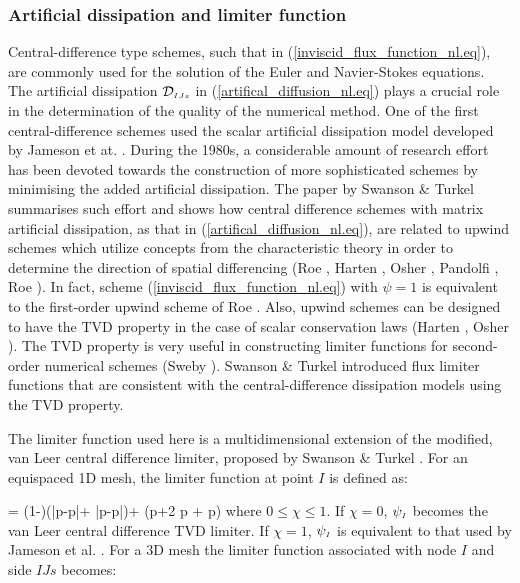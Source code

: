 \subsubsection{Artificial dissipation and limiter function}
%
 Central-difference type schemes, such that in (\ref{inviscid_flux_function_nl.eq}),
 are commonly used for the solution of the Euler and Navier-Stokes equations.
 The artificial dissipation ${\cal D}_{\mbox{\tiny $IJs$}}$ in (\ref{artifical_diffusion_nl.eq})
 plays a crucial role in the determination of the quality of the numerical method.
 One of the first central-difference schemes used the
 scalar artificial dissipation model developed by Jameson et at.
 \citeyear{Jame:1}. During the 1980s, a considerable amount of research effort
 has been devoted towards the construction of more sophisticated
 schemes by minimising the added artificial dissipation.
 The paper by Swanson \& Turkel \citeyear{Turkel:1} summarises
 such effort and shows how central difference schemes
 with matrix artificial dissipation, as that in (\ref{artifical_diffusion_nl.eq}),
 are related to upwind schemes which utilize concepts from the characteristic
 theory in order to determine the direction of spatial differencing
 (Roe , Harten , Osher ,
 Pandolfi , Roe ).
 In fact, scheme (\ref{inviscid_flux_function_nl.eq}) with $\psi = 1$
 is equivalent to the first-order upwind scheme of Roe \citeyear{Roe:1}.
 Also, upwind schemes can be designed to have the TVD property
 in the case of scalar conservation laws
 (Harten , Osher ).
 The TVD property is very useful in constructing limiter functions
 for second-order numerical schemes (Sweby ).
 Swanson \& Turkel \citeyear{Turkel:1} introduced flux limiter functions
 that are consistent with the central-difference dissipation models using the TVD
 property.

 The limiter function used here is a multidimensional extension
 of the modified, van Leer central difference limiter, proposed
 by Swanson \& Turkel \citeyear{Turkel:1}. For an equispaced
 1D mesh, the limiter function at point $I$ is defined as:

%
\beq
  \psi{} = 
               {\left(1-\chi\right)\left(\left|p-p\right|+
                                     \left|p-p\right|\right)+
                         \chi\left(p+2 p + p\right)}
  \label{limiter.eq}
\eeq
%
 where $0 \leq \chi \leq 1$. If $\chi = 0$, $\psi_{\mbox{\tiny $I$}}$ becomes
 the van Leer central difference TVD limiter. If $\chi = 1$,
 $\psi_{\mbox{\tiny $I$}}$ is equivalent to that used  by Jameson et al.  \citeyear{Jame:1}.
 For a 3D mesh the limiter function associated with node $I$
 and side $IJs$ becomes:

